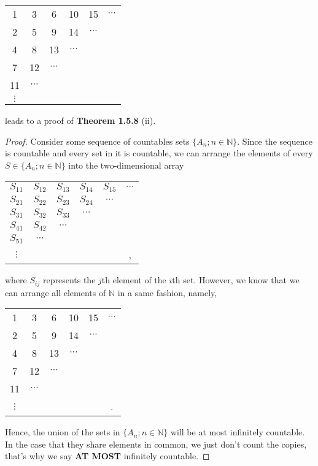 \documentclass[12pt]{article}
\newcommand{\N}{\mathbb{N}}
\newenvironment{problem}[2][Problem]{\begin{trivlist}
		\item[\hskip \labelsep {\bfseries #1}\hskip \labelsep {\bfseries #2.}]}{\end{trivlist}}
\begin{document}
\begin{problem}{1.5.3}
\begin{enumerate}[label=(\alph*)]
\begin{center}
\begin{tabular}{c c c c c c}
				1 & 3 & 6 & 10 & 15 & $\cdots$\\
				2 & 5 & 9 & 14 & $\cdots$&\\
				4 & 8 & 13 & $\cdots$ & & \\
				7 & 12 & $\cdots$ & & & \\
				11 & $\cdots$ & & & &\\
				$\vdots$ & & & & &
			\end{tabular}
			\end{center}
			leads to a proof of \textbf{Theorem 1.5.8} (ii).
			\begin{proof}
				Consider some sequence of countables sets $\{A_{n};n\in \N\}$. Since the sequence is countable and every set in it is countable, we can arrange the elements of every $S\in \{A_{n};n\in \N\}$ into the two-dimensional array
				\begin{center}
					\begin{tabular}{c c c c c c}
						$S_{11}$ & $S_{12}$ & $S_{13}$ & $S_{14}$ & $S_{15}$ & $\cdots$\\
						$S_{21}$ & $S_{22}$ & $S_{23}$ & $S_{24}$ & $\cdots$&\\
						$S_{31}$ & $S_{32}$ & $S_{33}$ & $\cdots$ & & \\
						$S_{41}$ & $S_{42}$ & $\cdots$ & & & \\
						$S_{51}$ & $\cdots$ & & & &\\
						$\vdots$ & & & & &,
					\end{tabular}
				\end{center}
			where $S_{ij}$ represents the $j$th element of the $i$th set. However, we know that we can arrange all elements of $\N$ in a same fashion, namely, 
				\begin{center}
				\begin{tabular}{c c c c c c}
					1 & 3 & 6 & 10 & 15 & $\cdots$\\
					2 & 5 & 9 & 14 & $\cdots$&\\
					4 & 8 & 13 & $\cdots$ & & \\
					7 & 12 & $\cdots$ & & & \\
					11 & $\cdots$ & & & &\\
					$\vdots$ & & & & &.
				\end{tabular}
			\end{center}
		Hence, the union of the sets in  $\{A_{n};n\in \N\}$ will be at most infinitely countable. In the case that they share elements in common, we just don't count the copies, that's why we say \textbf{AT MOST} infinitely countable.
			\end{proof}
		\end{enumerate}
	\end{problem}
\end{document}
